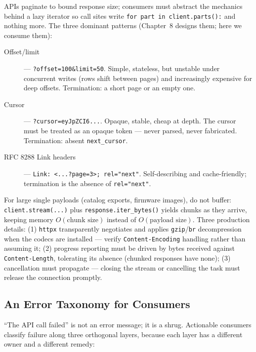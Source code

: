 APIs paginate to bound response size; consumers must abstract the mechanics
behind a lazy iterator so call sites write \texttt{for part in
client.parts():} and nothing more. The three dominant patterns
(Chapter~8 designs them; here we consume them):

\begin{description}
  \item[Offset/limit] --- \texttt{?offset=100\&limit=50}. Simple, stateless,
        but unstable under concurrent writes (rows shift between pages) and
        increasingly expensive for deep offsets. Termination: a short page or
        an empty one.
  \item[Cursor] --- \texttt{?cursor=eyJpZCI6...}. Opaque, stable, cheap at
        depth. The cursor must be treated as an opaque token --- never parsed,
        never fabricated. Termination: absent \texttt{next\_cursor}.
  \item[RFC 8288 Link headers] ---
        \texttt{Link: <...?page=3>; rel="next"}. Self-describing and
        cache-friendly; termination is the absence of \texttt{rel="next"}.
\end{description}

For large single payloads (catalog exports, firmware images), do not buffer:
\texttt{client.stream(...)} plus \texttt{response.iter\_bytes()} yields chunks
as they arrive, keeping memory $O(\text{chunk size})$ instead of
$O(\text{payload size})$. Three production details: (1) \texttt{httpx}
transparently negotiates and applies \texttt{gzip}/\texttt{br} decompression
when the codecs are installed --- verify \texttt{Content-Encoding} handling
rather than assuming it; (2) progress reporting must be driven by bytes
received against \texttt{Content-Length}, tolerating its absence
(chunked responses have none); (3) cancellation must propagate --- closing
the stream or cancelling the task must release the connection promptly.

\subsection{An Error Taxonomy for Consumers}
\label{sec:ch02-errors}

``The API call failed'' is not an error message; it is a shrug. Actionable
consumers classify failure along three orthogonal layers, because each layer
has a different owner and a different remedy:

